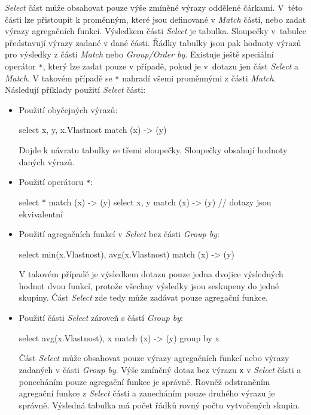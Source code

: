 \textit{Select} část může obsahovat pouze výše zmíněné výrazy oddělené čárkami.
V~této části lze přistoupit k proměnným, které jsou definované v \textit{Match} části, nebo zadat výrazy agregačních funkcí.
Výsledkem části \textit{Select} je tabulka.
Sloupečky v~tabulce představují výrazy zadané v dané části.
Řádky tabulky jsou pak hodnoty výrazů pro výsledky z části \textit{Match} nebo \textit{Group/Order by}.
Existuje ještě speciální operátor \texttt{*}, který lze zadat pouze v případě, pokud je v~dotazu jen část \textit{Select} a \textit{Match}.
V takovém případě se \texttt{*} nahradí všemi proměnnými z části \textit{Match}.
Následují příklady použití \textit{Select} části:
\begin{itemize}
\item
Použití obyčejných výrazů:
\begin{code}
select x, y, x.Vlastnost match (x) -> (y)
\end{code}
Dojde k návratu tabulky se třemi sloupečky.
Sloupečky obsahují hodnoty daných výrazů.

\item
Použití operátoru \texttt{*}:
\begin{code}
select * match (x) -> (y)
select x, y match (x) -> (y) 
// dotazy jsou ekvivalentní
\end{code} 

\item
Použití agregačních funkcí v \textit{Select} bez části \textit{Group by}:
\begin{code}
select min(x.Vlastnost), avg(x.Vlastnost) match (x) -> (y)
\end{code}
V takovém případě je výsledkem dotazu pouze jedna dvojice výsledných hodnot dvou funkcí, protože všechny výsledky jsou seskupeny do jedné skupiny.
Část \textit{Select} zde tedy může zadávat pouze agregační funkce.

\item
Použití části \textit{Select} zároveň s částí \textit{Group by}:
\begin{code}
select avg(x.Vlastnost), x match (x) -> (y) group by x
\end{code}
Část \textit{Select} může obsahovat pouze výrazy agregačních funkcí nebo výrazy zadaných v části \textit{Group by}.
Výše zmíněný dotaz bez výrazu \texttt{x} v \textit{Select} části a ponecháním pouze agregační funkce je správně.
Rovněž odstraněním agregační funkce z \textit{Select} části a zanecháním pouze druhého výrazu je správně.
Výsledná tabulka má počet řádků rovný počtu vytvořených skupin.
\end{itemize}

